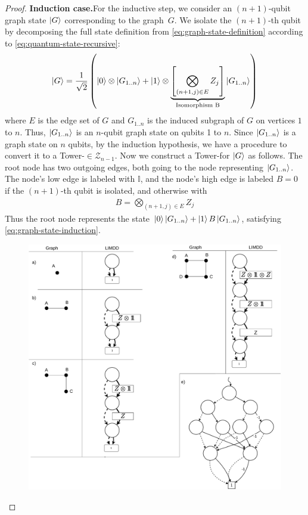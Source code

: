 \begin{proof}
	\textbf{Induction case.}For the inductive step, we consider an $(n+1)$-qubit graph state $\ket{G}$ corresponding to the graph~$G$.
	We isolate the $(n+1)$-th qubit by decomposing the full state definition from  \autoref{eq:graph-state-definition} according to \autoref{eq:quantum-state-recursive}:
	\begin{equation}
        \ket{G} = 
        \frac{1}{\sqrt{2}}\left(\ket{0} \otimes \ket{G_{1..n}} + \ket{1} \otimes 
            \underset{\textnormal{Isomorphism B}}{ \underbrace{
\left[
            \bigotimes_{(n+1,j)\in E} Z_j
            \right] 
            }}
        \ket{G_{1..n}}\right)
		\label{eq:graph-state-induction}
	\end{equation}
where $E$ is the edge set of $G$ and $G_{1..n}$ is the induced subgraph of $G$ on vertices $1$ to $n$.
Thus, $\ket{G_{1..n}}$ is an $n$-qubit graph state on qubits 1 to $n$.
    Since $\ket{G_{1..n}}$ is a graph state on $n$ qubits, by the induction hypothesis, we have a procedure to convert it to a Tower-\limdd $\in \mathcal{Z}_{n-1}$.
Now we construct a Tower-\limdd for $\ket{G}$ as follows.
The root node has two outgoing edges, both going to the node representing $\ket{G_{1.. n}}$.
    The node's low edge is labeled with $\mathbb I$, and the node's high edge is labeled $B=0$ if the $(n+1)$-th qubit is isolated, and otherwise with 
\begin{align}
	B = \bigotimes_{(n+1,j)\in E}Z_j
\end{align}
Thus the root node represents the state $\ket{0}\ket{G_{1..n}}+\ket{1}B\ket{G_{1..n}}$, satisfying \autoref{eq:graph-state-induction}.
\begin{figure}
    \begin{centering}
    \includegraphics[width=1.0\textwidth]{pics/graph-state-construction.pdf}

\end{centering}
\end{figure}
\end{proof}
